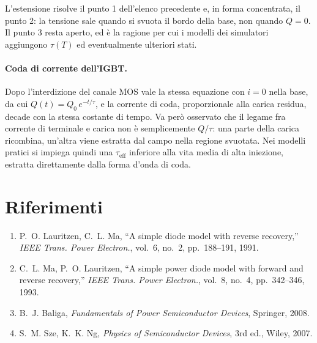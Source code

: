 \documentclass[11pt,a4paper]{article}
\begin{document}
L'estensione risolve il punto 1 dell'elenco precedente e, in forma concentrata, il
punto 2: la tensione sale quando si svuota il bordo della base, non quando $Q = 0$. Il
punto 3 resta aperto, ed \`e la ragione per cui i modelli dei simulatori aggiungono
$\tau(T)$ ed eventualmente ulteriori stati.

\paragraph{Coda di corrente dell'IGBT.} Dopo l'interdizione del canale MOS vale la
stessa equazione con $i = 0$ nella base, da cui
$Q(t) = Q_0\,e^{-t/\tau}$, e la corrente di coda, proporzionale alla carica residua, decade
con la stessa costante di tempo. Va per\`o osservato che il legame fra corrente di
terminale e carica non \`e semplicemente $Q/\tau$: una parte della carica ricombina, un'altra viene
estratta dal campo nella regione svuotata. Nei modelli pratici si impiega quindi una
$\tau_{\text{eff}}$ inferiore alla vita media di alta iniezione, estratta direttamente
dalla forma d'onda di coda.

\section*{Riferimenti}

\begin{enumerate}
  \item P.~O. Lauritzen, C.~L. Ma, ``A simple diode model with reverse recovery,''
        \emph{IEEE Trans. Power Electron.}, vol.~6, no.~2, pp.~188--191, 1991.
  \item C.~L. Ma, P.~O. Lauritzen, ``A simple power diode model with forward and
        reverse recovery,'' \emph{IEEE Trans. Power Electron.}, vol.~8, no.~4,
        pp.~342--346, 1993.
  \item B.~J. Baliga, \emph{Fundamentals of Power Semiconductor Devices}, Springer,
        2008.
  \item S.~M. Sze, K.~K. Ng, \emph{Physics of Semiconductor Devices}, 3rd ed., Wiley,
        2007.
\end{enumerate}
\end{document}
